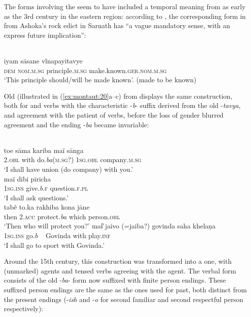 \documentclass[output=paper]{langsci/langscibook}
\begin{document}
The forms involving the  seem to have included a temporal meaning from as early as the 3rd century in the eastern region: according to \citet[966]{Chatterji1926}, the corresponding form in  from Ashoka’s rock edict in Sarnath has “a vague mandatory sense, with an express future implication”:

\ea
\label{ex:montaut:19}
\\
\gll iyam    sāsane               vĩnapayitavye\\
\textsc{dem nom.m.sg}   principle.\textsc{m.sg} make.known.\textsc{ger.nom.m.sg} \\
\glt ‘This principle should/will be made known’. (made to be known)
\z 

Old  (illustrated in (\ref{ex:montaut:20}a--c) from \citep[967 ff]{Chatterji1926} displays the same construction, both for  and  verbs with the characteristic -\textit{b}{}- suffix derived from the old -\textit{tavya}, and agreement with the patient of  verbs, before the loss of gender blurred agreement and the ending -\textit{ba} became invariable:

\ea\label{ex:montaut:20}
\ea 
{}\\
\gll toe sāma   kariba   maï       sānga\\
 \textsc{2.obl}   with     do.\textit{ba}(\textsc{m.sg?})   \textsc{1sg.obl}   company\textsc{.m.sg} \\
\glt ‘I shall have union (do company) with you.’ 
\ex 
{}\\
\gll maï dibi   piricha\\
\textsc{1sg.ins}  give.\textit{b}.\textsc{f}   question.\textsc{f.pl}  \\
\glt ‘I shall ask questions.’ 
\ex 
{}\\
\gll tab\~{e} to.ka   rakhiba  kona  jāne\\
then   \textsc{2.acc}  protect.\textit{ba}    which   person.\textsc{obl} \\
\glt ‘Then who will protect you?’  
\ex 
\gll mai͂  jaivo (=jaiba?)  govinda   saha    khelaṇa\\
 \textsc{1sg.ins}  go.\textit{b}    ~            Govinda   with    play.\textsc{inf} \\
\glt ‘I shall go to sport with Govinda.’ \citep[30]{Chatterji1986}
\z 
\z 
 
Around the 15th century, this construction was transformed into a  one, with  (unmarked) agents and tensed verbs agreeing with the agent. The verbal form consists of the old -\textit{ba}- form now suffixed with finite person endings. These suffixed person endings are the same as the ones used for past, both distinct from the present endings (-\textit{ish} and -\textit{o} for second familiar and second respectful person respectively):
\end{document}
